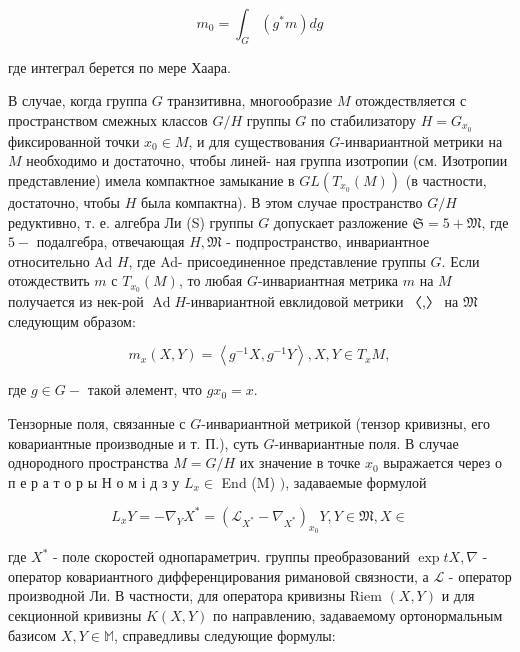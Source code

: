 \documentclass[10pt]{article}
\begin{document}
\[

m_{0}=\int_{G}\left(g^{*} m\right) d g

\]



где интеграл берется по мере Хаара.



В случае, когда группа $G$ транзитивна, многообразие $M$ отождествляется с пространством смежных классов $G / H$ группы $G$ по стабилизатору $H=G_{x_{0}}$ фиксированной точки $x_{0} \in M$, и для существования $G$-инвариантной метрики на $M$ необходимо и достаточно, чтобы линей- ная группа изотропии (см. Изотропии представление) имела компактное замыкание в $G L\left(T_{x_{0}}(M)\right)$ (в частности, достаточно, чтобы $H$ была компактна). В этом случае пространство $G / H$ редуктивно, т. е. алгебра Ли (S) группы $G$ допускает разложение $\mathfrak{S}=\mathfrak{5}+\mathfrak{M}$, где $\mathfrak{5}-$ подалгебра, отвечающая $H, \mathfrak{M}$ - подпространство, инвариантное относительно Ad $H$, где Ad- присоединенное представление группы $G$. Если отождествить $m$ с $T_{x_{0}}(M)$, то любая $G$-инвариантная метрика $m$ на $M$ получается из нек-рой $\operatorname{Ad} H$-инвариантной евклидовой метрики 〈,〉 на $\mathfrak{M}$ следующим образом:



\[

m_{x}(X, Y)=\left\langle g^{-1} X, g^{-1} Y\right\rangle, X, Y \in T_{x} M,

\]



где $g \in G-$ такой әлемент, что $g x_{0}=x$.



Тензорные поля, связанные с $G$-инвариантной метрикой (тензор кривизны, его ковариантные производные и т. П.), суть $G$-инвариантные поля. В случае однородного пространства $M=G / H$ их значение в точке $x_{0}$ выражается через о п е р а т о р ы Н о м і д з у $L_{x} \in$ End (M) $)$, задаваемые формулой



\[

L_{x} Y=-\nabla_{Y} X^{*}=\left(\mathscr{L}_{X^{*}}-\nabla_{X^{*}}\right)_{x_{0}} Y, Y \in \mathfrak{M}, X \in

\]



где $X^{*}$ - поле скоростей однопараметрич. группы преобразований $\exp t X, \nabla$ - оператор ковариантного дифференцирования римановой связности, а $\mathscr{L}$ - оператор производной Ли. В частности, для оператора кривизны Riem $(X, Y)$ и для секционной кривизны $K(X, Y)$ по направлению, задаваемому ортонормальным базисом $X, Y \in \mathbb{M}$, справедливы следующие формулы:
\end{document}
